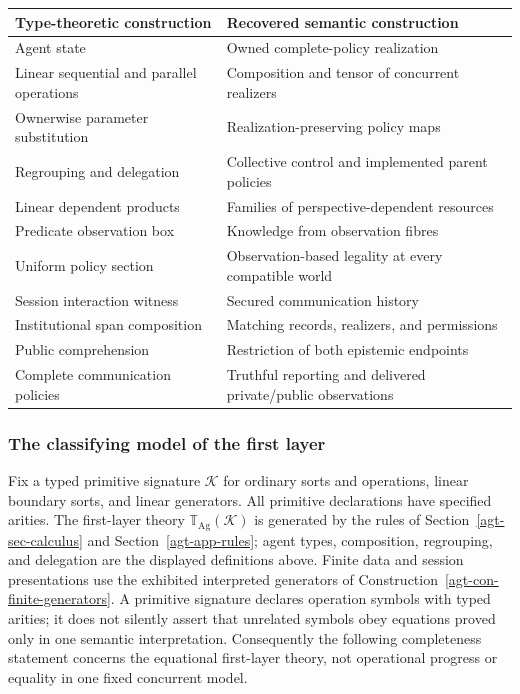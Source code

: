 \documentclass[11pt,a4paper]{article}
\numberwithin{equation}{section}
\theoremstyle{definition}
\theoremstyle{remark}
\theoremstyle{plain}
\begin{document}
\begin{center}
\small
\begin{tabular}{p{}p{}}
\toprule
Type-theoretic construction & Recovered semantic construction\\
\midrule
Agent state & Owned complete-policy realization\\
Linear sequential and parallel operations & Composition and tensor of concurrent realizers\\
Ownerwise parameter substitution & Realization-preserving policy maps\\
Regrouping and delegation & Collective control and implemented parent policies\\
Linear dependent products & Families of perspective-dependent resources\\
Predicate observation box & Knowledge from observation fibres\\
Uniform policy section & Observation-based legality at every compatible world\\
Session interaction witness & Secured communication history\\
Institutional span composition & Matching records, realizers, and permissions\\
Public comprehension & Restriction of both epistemic endpoints\\
Complete communication policies & Truthful reporting and delivered private/public observations\\
\bottomrule
\end{tabular}
\end{center}

\subsubsection{The classifying model of the first layer}

Fix a typed primitive signature $\mathcal K$ for ordinary sorts and
operations, linear boundary sorts, and linear generators. All primitive
declarations have specified arities. The first-layer theory
$\mathbb T_{\mathrm{Ag}}(\mathcal K)$ is generated by the rules of
Section~\ref{agt-sec-calculus} and Section~\ref{agt-app-rules}; agent types,
composition, regrouping, and delegation are the displayed definitions above.
Finite data and session presentations use the exhibited interpreted
generators of Construction~\ref{agt-con-finite-generators}.  A primitive
signature declares operation symbols with typed arities; it does not silently
assert that unrelated symbols obey equations proved only in one semantic
interpretation.  Consequently the following completeness statement concerns
the equational first-layer theory, not operational progress or equality in
one fixed concurrent model.
\end{document}
